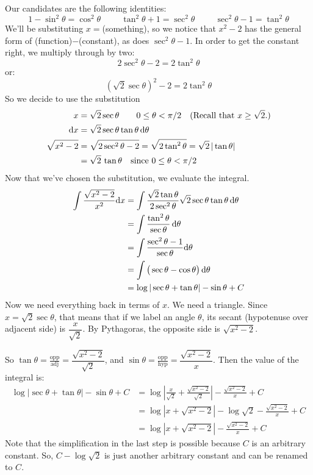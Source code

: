 \begin{solution}
Our candidates are the following identities:
\[1-\sin^2\theta=\cos^2\theta \hspace{1cm} \tan^2\theta+1=\sec^2\theta \hspace{1cm} \sec^2\theta-1=\tan^2\theta\]
We'll be substituting $x=$(something), so we notice that $x^2-2$ has the general form of
(function)$-$(constant), as does $\sec^2\theta-1$. In order to get the constant right, we multiply through by two:
\[2\sec^2\theta-2=2\tan^2\theta\]
or:
\[(\sqrt{2}\sec \theta)^2-2=2\tan^2\theta\]
So we decide to use the substitution
\begin{align*}
x&=\sqrt{2}\sec\theta\qquad 0\le \theta < \pi/2\quad \text{(Recall that $x\ge\sqrt{2}$.)} \\
\mathrm{d}x&=\sqrt{2}\sec\theta\tan\theta\, \mathrm{d}\theta \\
\sqrt{x^2-2}&=\sqrt{2\sec^2\theta-2}
            =\sqrt{2\tan^2\theta}
            =\sqrt{2}\,|\tan\theta| \\
            &=\sqrt{2}\,\tan\theta\quad\text{since }0\le \theta < \pi/2
\end{align*}
Now that we've chosen the substitution, we evaluate the integral.
\begin{align*}
\int\frac{\sqrt{x^2-2}}{x^2}\mathrm{d}x
&=\int
\frac{\sqrt{2}\tan\theta}{2\sec^2\theta}\sqrt{2}\sec\theta\tan\theta\,
\mathrm{d}\theta\\
&=\int
\frac{\tan^2\theta}{\sec\theta}\,
\mathrm{d}\theta\\
&=
\int \frac{\sec^2\theta-1}{\sec\theta}\mathrm{d}\theta\\
&=\int \big(\sec\theta-\cos\theta\big)\, \mathrm{d}\theta\\
&=\log|\sec\theta + \tan\theta|-\sin\theta +C
\end{align*}
Now we need everything back in terms of $x$. We need a triangle. Since $x=\sqrt{2}\sec\theta$, that means that if we label an angle $\theta$, its secant (hypotenuse over adjacent side) is $\dfrac{x}{\sqrt{2}}$. By Pythagoras, the opposite side is $\sqrt{x^2-2}$.
\begin{center}
\end{center}
So $\tan \theta = \frac{\mbox{opp}}{\mbox{adj}}=\dfrac{\sqrt{x^2-2}}{\sqrt{2}}$, and $\sin\theta = \frac{\mbox{opp}}{\mbox{hyp}}=\dfrac{\sqrt{x^2-2}}{x}$. Then the value of the integral is:
\begin{align*}
\log|\sec\theta + \tan\theta|-\sin\theta +C
&={ \log \left|
\frac{x}{\sqrt{2}}+\frac{\sqrt{x^2-2}}{\sqrt{2}}
\right|-\frac{\sqrt{x^2-2}}{x}+C}\\
&={ \log \left| x+{\sqrt{x^2-2}}
\right|-\log\sqrt{2}-\frac{\sqrt{x^2-2}}{x}+C}\\
&= \log \left| x+{\sqrt{x^2-2}}
\right|-\frac{\sqrt{x^2-2}}{x}+C
\end{align*}
Note that the simplification in the last step is possible because $C$ is an arbitrary constant. So, $C-\log\sqrt{2}$ is just another arbitrary constant and can be renamed to $C$.
\end{solution}




